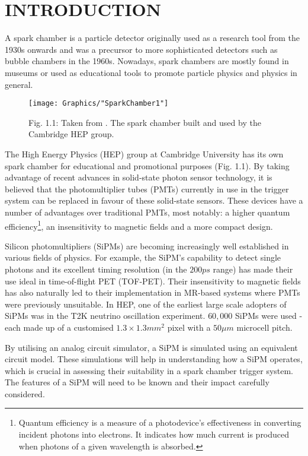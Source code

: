 
\section{INTRODUCTION}

A spark chamber is a particle detector originally used as a research tool from the 1930s onwards and was a precursor to more sophisticated detectors such as bubble chambers in the 1960s. Nowadays, spark chambers are mostly found in museums or used as educational tools to promote particle physics and physics in general. \cite{HEPscatter}

\begin{figure}[h]
  \texttt{[image: Graphics/"SparkChamber1"]}
  {\caption*{Fig. 1.1: Taken from \cite{HEPscatter}. The spark chamber built and used by the Cambridge HEP group.}}
\end{figure}

\noindent The High Energy Physics (HEP) group at Cambridge University has its own spark chamber for educational and promotional purposes (Fig. 1.1). By taking advantage of recent advances in solid-state photon sensor technology, it is believed that the photomultiplier tubes (PMTs) currently in use in the trigger system can be replaced in favour of these solid-state sensors. These devices have a number of advantages over traditional PMTs, most notably: a higher quantum efficiency\footnote{Quantum efficiency is a measure of a photodevice's effectiveness in converting incident photons into electrons. It indicates how much current is produced when photons of a given wavelength is absorbed.}, an insensitivity to magnetic fields and a more compact design. \cite{dinu2007}

Silicon photomultipliers (SiPMs) are becoming increasingly well established in various fields of physics. For example, the SiPM's capability to detect single photons and its excellent timing resolution (in the $200ps$ range) has made their use ideal in time-of-flight PET (TOF-PET). Their insensitivity to magnetic fields has also naturally led to their implementation in MR-based systems where PMTs were previously unsuitable. \cite{gundacker2020} In HEP, one of the earliest large scale adopters of SiPMs was in the T2K neutrino oscillation experiment. $60,000$ SiPMs were used - each made up of a customised $1.3\times 1.3 mm^2$ pixel with a $50\mu m$ microcell pitch. \cite{vacheret2011}

By utilising an analog circuit simulator, a SiPM is simulated using an equivalent circuit model. These simulations will help in understanding how a SiPM operates, which is crucial in assessing their suitability in a spark chamber trigger system. The features of a SiPM will need to be known and their impact carefully considered.
